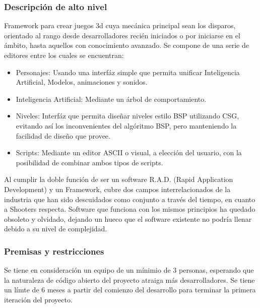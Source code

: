 \documentclass[]{article}
\begin{document}
\subsubsection{Descripci\'on de alto nivel}
Framework para crear juegos 3d cuya mec\'anica principal sean los disparos, orientado al rango desde desarrolladores reci\'en iniciados o por iniciarse en el \'ambito, hasta aquellos con conocimiento avanzado. Se compone de una serie de editores entre los cuales se encuentran:
\begin{itemize}
	\item Personajes: Usando una interf\'az simple que permita unificar Inteligencia Artificial, Modelos, animaciones y sonidos. 
	\item Inteligencia Artificial: Mediante un \'arbol de comportamiento.
	\item Niveles: Interf\'az que permita dise\~nar niveles estilo BSP utilizando CSG, evitando as\'i los inconvenientes del alg\'oritmo BSP, pero manteniendo la facilidad de dise\~no que provee. 
	\item Scripts: Mediante un editor ASCII o visual, a elecci\'on del usuario, con la posibilidad de combinar ambos tipos de scripts. 
\end{itemize}	
Al cumplir la doble funci\'on de ser un software R.A.D. (Rapid Application Development) y un Framework, cubre dos campos interrelacionados de la industria que han sido descuidados como conjunto a trav\'es del tiempo, en cuanto a Shooters respecta. 
Software que funciona con los mismos principios ha quedado obsoleto y olvidado, dejando un hueco que el software existente no podr\'ia llenar debido a su nivel de complejidad.

\subsubsection{Premisas y restricciones}
Se tiene en consideraci\'on un equipo de un m\'inimio de 3 personas, esperando que la naturaleza de c\'odigo abierto del proyecto atraiga m\'as desarrolladores. Se tiene un l\'imte de 6 meses a partir del comienzo del desarrollo para terminar la primera iteraci\'on del proyecto. 
\end{document}
